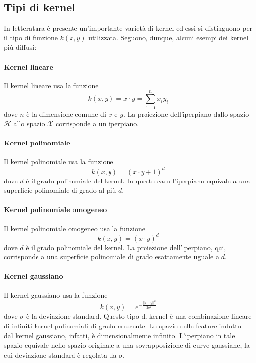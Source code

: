\documentclass[12pt]{report}
\theoremstyle{definition}
\begin{document}
\subsection{Tipi di kernel}
In letteratura è presente un'importante varietà di kernel ed essi si distinguono per il tipo di funzione $k(x,y)$ utilizzata. Seguono, dunque, alcuni esempi dei kernel più diffusi:

\paragraph{Kernel lineare}
Il kernel lineare usa la funzione
\begin{equation}
    k(x,y) = x \cdot y = \sum\limits_{i=1}^n x_iy_i
\end{equation}
dove $n$ è la dimensione comune di $x$ e $y$.
La proiezione dell'iperpiano dallo spazio $\mathcal{H}$ allo spazio $\mathcal{X}$ corrisponde a un iperpiano.

\paragraph{Kernel polinomiale}
Il kernel polinomiale usa la funzione
\begin{equation}
    k(x,y) = (x \cdot y + 1)^d
\end{equation}
dove $d$ è il grado polinomiale del kernel.
In questo caso l'iperpiano equivale a una superficie polinomiale di grado al più $d$.

\paragraph{Kernel polinomiale omogeneo}
Il kernel polinomiale omogeneo usa la funzione
\begin{equation}
    k(x,y) = (x \cdot y)^d
\end{equation}
dove $d$ è il grado polinomiale del kernel. La proiezione dell'iperpiano, qui, corrisponde a una superficie polinomiale di grado esattamente uguale a $d$.

\paragraph{Kernel gaussiano}
Il kernel gaussiano usa la funzione
\begin{equation}
    k(x,y) = e^{-\frac{||x-y||^2}{2\sigma^2}}
\end{equation}
dove $\sigma$ è la deviazione standard. Questo tipo di kernel è una combinazione lineare di infiniti kernel polinomiali di grado crescente. Lo spazio delle feature indotto dal kernel gaussiano, infatti, è dimensionalmente infinito. L'iperpiano in tale spazio equivale nello spazio originale a una sovrapposizione di curve gaussiane, la cui deviazione standard è regolata da $\sigma$.
\end{document}
